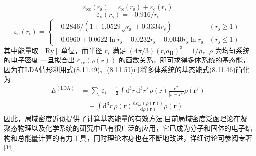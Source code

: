 \begin{equation}
  \varepsilon_{\mathrm{xc}}(r_{\mathrm{s}})=\varepsilon_{\mathrm{x}}(r_{\mathrm{s}})+\varepsilon_{\mathrm{c}}(r_{\mathrm{s}})
\end{equation}
\begin{equation}
  \varepsilon_{\mathrm{x}}(r_{\mathrm{s}})=-0.916/r_{\mathrm{s}}
\end{equation}
\begin{equation}
  \varepsilon_{\mathrm{c}}(r_{\mathrm{s}})=\begin{cases}
    -0.2846/(1+1.0529\sqrt{r_{\mathrm{s}}}+0.3334r_{\mathrm{s}}) & (r_{\mathrm{s}}\geqslant 1)\\[0.3em]
    -0.0960+0.0622\ln r_{\mathrm{s}}-0.0232r_{\mathrm{s}}+0.0040r_{\mathrm{s}}\ln r_{\mathrm{s}} & (r_{\mathrm{s}}\leqslant 1)
  \end{cases}
\end{equation}
其中能量取 $[\mathrm{Ry}]$ 单位，而半径 $r_{\mathrm{s}}$ 满足 $(4\pi/3)(r_{\mathrm{s}}a_{\mathrm{H}})^{3}=1/\rho$，$\rho$ 为均匀系统的电子密度.一旦拟合出 $\varepsilon_{\mathrm{xc}}(\rho(\boldsymbol{r}))$ 的函数关系，即可求得多体系统的基态能，因为在LDA情形利用式(8.11.49)、(8.11.50)可将多体系统的基态能式(8.11.46)简化为
\begin{equation}
\begin{aligned}
  E^{(\mathrm{LDA})}
  &=\sum_{i}\varepsilon_{i}
  -\frac{1}{2}\int\mathrm{d}^{3}r\,\mathrm{d}^{3}r'\,\rho(\boldsymbol{r})
  \frac{e^{2}}{|\boldsymbol{r}-\boldsymbol{r}'|}\rho(\boldsymbol{r}')\\
  &\quad-\int\mathrm{d}^{3}r\,\rho(\boldsymbol{r})
  \frac{\mathrm{d}\varepsilon_{\mathrm{xc}}(\rho(\boldsymbol{r}))}{\mathrm{d}\rho(\boldsymbol{r})}\rho(\boldsymbol{r})
\end{aligned}
\end{equation}
因此，局域密度近似提供了计算基态能量的有效方法.目前局域密度泛函理论在凝聚态物理以及化学系统的研究中已有很广泛的应用，它已成为分子和固体的电子结构和总能量计算的有力工具，同时理论本身也在不断地改进，详细讨论可参阅专著\textsuperscript{[34]}.

